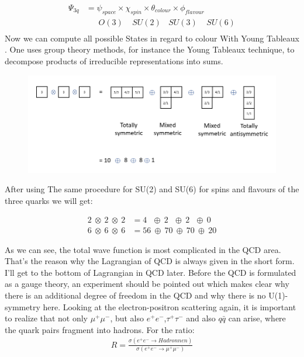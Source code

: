 \begin{equation}
\begin{split}
\Psi_{3q} &= \psi_{space} \times \chi_{spin} \times \theta_{colour} \times \phi_{flavour} \\
&\:\:\:\:\:\:\:O(3) \:\:\:\:\: SU(2)\:\:\:\: SU(3)\:\:\:\:\: SU(6)\\
\end{split}
\end{equation}
Now we can compute all possible States in regard to colour With Young Tableaux \cite{Greiner1989}. One uses group theory methods, for instance the Young Tableaux technique, to decompose products of irreducible representations into sums.
\begin{figure}[h!]
\centering
\includegraphics[scale=0.7]{images/Intro/Young.png}
\end{figure}

After using The same procedure for SU(2) and SU(6) for spins and flavours of the three quarks we will get:

\begin{equation}
\begin{split}
2\: \otimes\:2 \:\otimes\:2 &= 4 \:\:\:\oplus\: 2\:\:\:\oplus\:2\:\:\:\oplus\:0\\
6\: \otimes\:6 \:\otimes\:6&= 56 \:\oplus\: 70\:\oplus\:70\:\oplus\:20
\end{split}
\end{equation}

As we can see, the total wave function is most complicated in the QCD area. That's the reason why the Lagrangian of QCD is always given in the short form. I'll get to the bottom of Lagrangian in QCD later. 
Before the QCD is formulated as a gauge theory, an experiment should be pointed out which makes clear why there is an additional degree of freedom in the QCD and why there is no
U(1)-symmetry here. Looking at the electron-positron scattering again, it is important to realize that not only $ \mu^+ \mu^- $, but also $ e^+ e^- $,$ \tau^+ \tau^- $ and also $ q \bar{q} $ can arise, where the quark pairs fragment into hadrons. For the ratio:
\begin{equation}
\begin{split}
R = \frac{\sigma(e^+e^- \rightarrow Hadronnen)}{\sigma(e^+e^- \rightarrow \mu^+ \mu^-)}
\end{split}
\end{equation}


